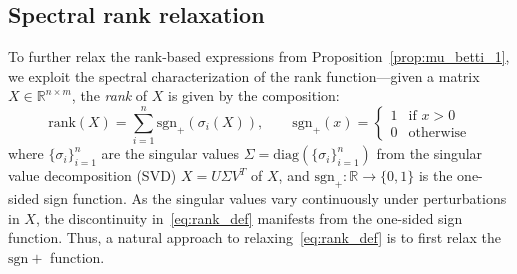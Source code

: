 \documentclass[10pt]{article}
\numberwithin{equation}{section}
\newcommand{\+}{%
	\raisebox{0.18ex}{\scaleobj{0.55}{+}}
}
\theoremstyle{definition}
\theoremstyle{definition}
\begin{document}
\subsection{Spectral rank relaxation}\label{sec:spectral_relax}
To further relax the rank-based expressions from Proposition~\ref{prop:mu_betti_1}, we exploit the spectral characterization of the rank function---given a matrix $X \in \mathbb{R}^{n \times m}$, the \emph{rank} of $X$ is given by the composition:
\begin{equation}\label{eq:rank_def}
	\mathrm{rank}(X) = \sum\limits_{i=1}^{n} \mathrm{sgn}_+(\sigma_i(X)), \quad \quad \mathrm{sgn}_{+}(x) = \begin{cases}
		1 & \text{if } x > 0 \\
		0 & \text{otherwise}
	\end{cases}
\end{equation}
where $\{\sigma_i \}_{i=1}^n$ are the singular values $\Sigma = \mathrm{diag}(\{\sigma_i \}_{i=1}^n)$ from the singular value decomposition (SVD) $X = U \Sigma V^T$ of $X$, and $\mathrm{sgn}_+: \mathbb{R} \to \{0, 1\}$ is the one-sided sign function. 
 As the singular values vary continuously under perturbations in $X$, the discontinuity in~\eqref{eq:rank_def} manifests from the one-sided sign function.
 Thus, a natural approach to relaxing~\eqref{eq:rank_def} is to first relax the $\mathrm{sgn}+$ function.
\end{document}
